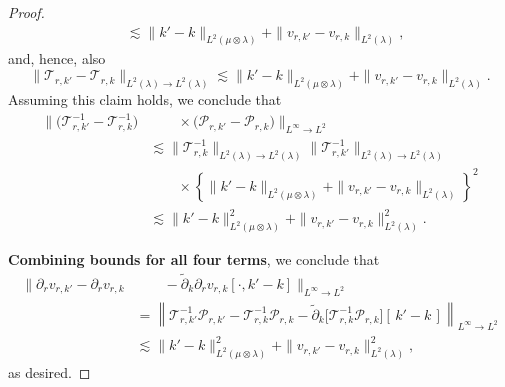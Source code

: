 \documentclass[11pt]{article}
\newcommand{\adk}{\widetilde{\partial}_k}
\theoremstyle{plain}
\begin{document}
\begin{proof}
\[\begin{aligned}
&\lesssim \|k'-k\|_{L^2(\mu\otimes\lambda)}
    +  \|v_{r,k'}-v_{r,k}\|_{L^2(\lambda)},
\end{aligned}
\]
and, hence, also
\[
\|\mathcal{T}_{r,k'}-\mathcal{T}_{r,k}\|_{L^2(\lambda)\to L^2(\lambda)}
\lesssim \|k'-k\|_{L^2(\mu\otimes\lambda)}
    +  \|v_{r,k'}-v_{r,k}\|_{L^2(\lambda)}.
\]
Assuming this claim holds, we conclude that
\begin{align*}
   \big\|\big(\mathcal{T}_{r,k'}^{-1} - \mathcal{T}_{r,k}^{-1}\big)
&\qquad \times \big(\mathcal{P}_{r,k'} - \mathcal{P}_{r,k}\big)\big\|_{L^\infty \to L^2} \\
   &\lesssim  \|\mathcal{T}_{r,k}^{-1}\|_{L^2(\lambda) \to L^2(\lambda)}
       \|\mathcal{T}_{r,k'}^{-1}\|_{L^2(\lambda) \to L^2(\lambda)} \\
   &\qquad \times \left\{ \|k'-k\|_{L^2(\mu\otimes\lambda)}
    +  \|v_{r,k'}-v_{r,k}\|_{L^2(\lambda)} \right\}^2 \\
     &\lesssim    \|k'-k\|_{L^2(\mu\otimes\lambda)}^2
    +  \|v_{r,k'}-v_{r,k}\|_{L^2(\lambda)}^2.
\end{align*}


\noindent \textbf{Combining bounds for all four terms}, we conclude that
\begin{align*}
 \|\partial_r v_{r,k'} - \partial_r v_{r,k}
&\qquad -  \adk \partial_r v_{r,k}[\cdot, k' - k]  \|_{L^\infty \rightarrow L^2} \\
&= \left \|\mathcal{T}_{r,k'}^{-1}\mathcal{P}_{r,k'}
 - \mathcal{T}_{r,k}^{-1}\mathcal{P}_{r,k}
 - \adk\!\big[\mathcal{T}_{r,k}^{-1}\mathcal{P}_{r,k}\big][\,k' - k\,] \right\|_{L^\infty \rightarrow L^2} \\
 & \lesssim  \|k'-k\|_{L^2(\mu\otimes\lambda)}^2
      + \|v_{r,k'}-v_{r,k}\|_{L^2(\lambda)}^2,
\end{align*}
as desired.
   



\end{proof}
\end{document}
